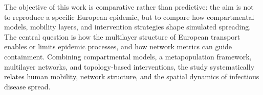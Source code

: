 The objective of this work is comparative rather than predictive: the aim is not to reproduce a specific European epidemic, but to compare how compartmental models, mobility layers, and intervention strategies shape simulated spreading. The central question is how the multilayer structure of European transport enables or limits epidemic processes, and how network metrics can guide containment. Combining compartmental models, a metapopulation framework, multilayer networks, and topology-based interventions, the study systematically relates human mobility, network structure, and the spatial dynamics of infectious disease spread.